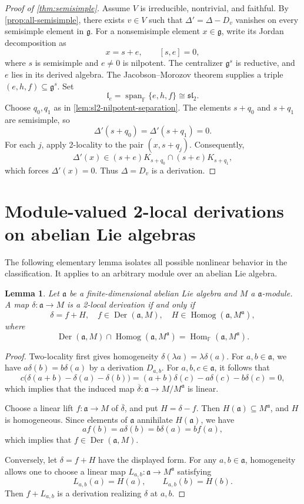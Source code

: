 \documentclass[12pt,reqno]{amsart}
\newtheorem{lemma}[theorem]{Lemma}
\theoremstyle{definition}
\theoremstyle{remark}
\numberwithin{equation}{section}
\newcommand{\F}{\mathbb{F}}
\newcommand{\g}{\mathfrak{g}}
\newcommand{\aLie}{\mathfrak{a}}
\newcommand{\Der}{\operatorname{Der}}
\newcommand{\Span}{\operatorname{span}}
\newcommand{\Homog}{\operatorname{Homog}}
\begin{document}
\begin{proof}[Proof of \cref{thm:semisimple}]
Assume \(V\) is irreducible, nontrivial, and faithful. By \cref{prop:all-semisimple}, there exists \(v\in V\) such that
\(\Delta'=\Delta-D_{v}\) vanishes on every semisimple element in \(\g\).
For a nonsemisimple element \(x\in\g\), write its Jordan
decomposition as
\[
  x=s+e,\qquad [s,e]=0,
\]
where \(s\) is semisimple and \(e\ne 0\) is nilpotent.
The centralizer \(\g^s\) is reductive, and \(e\) lies in its derived algebra.
The Jacobson--Morozov theorem supplies a triple \((e,h,f)\subseteq\g^s\).
Set
\[
  \mathfrak l_e= \Span_\F\{e,h,f\}\cong\mathfrak{sl}_2.
\]
Choose \(q_0,q_1\) as in \cref{lem:sl2-nilpotent-separation}.
The elements \(s+q_0\) and \(s+q_1\) are semisimple, so
\[
  \Delta'(s+q_0)= \Delta'(s+q_1)=0.
\]
For each \(j\), apply 2-locality to the pair \((x,s+q_j)\). Consequently,
\[
  \Delta'(x)\in(s+e)K_{s+q_0}\cap (s+e)K_{s+q_1},
\]
which forces \(\Delta'(x)=0\). Thus \(\Delta=D_v\) is a derivation.
\end{proof}

\section{Module-valued 2-local derivations on abelian Lie algebras}

The following elementary lemma isolates all possible nonlinear behavior in
the classification. It applies to an arbitrary module over an abelian Lie
algebra.

\begin{lemma}\label{lem:abelian-classification}
Let \(\aLie\) be a finite-dimensional abelian Lie algebra and \(M\) a \(\aLie\)-module. A map
\(\delta\colon\aLie\to M\) is a 2-local derivation if and only if
\[
 \delta=f+H,
 \quad
 f\in\Der(\aLie,M),\quad
 H\in\Homog(\aLie,M^\aLie),
\]
where
\[
\Der(\aLie,M)\cap \Homog(\aLie,M^\aLie)= \operatorname{Hom}_{\F}(\aLie,M^\aLie).
\]
\end{lemma}

\begin{proof}
Two-locality first gives homogeneity \(\delta(\lambda a)=\lambda\delta(a)\).
For \(a,b\in\aLie\), we have \(a\delta(b)=b\delta(a)\) by a derivation \(D_{a,b}\).
For \(a,b,c\in\aLie\), it follows that
\[
 c\bigl(\delta(a+b)-\delta(a)-\delta(b)\bigr)=(a+b)\delta(c)-a\delta(c)-b\delta(c)=0,
\]
which implies that the induced map \(\overline\delta\colon\aLie\longrightarrow M/M^\aLie\) is linear.

Choose a linear lift \(f\colon\aLie\to M\) of \(\overline\delta\), and put
\(H=\delta-f\).  Then \(H(\aLie)\subseteq M^\aLie\), and \(H\) is
homogeneous.  Since elements of \(\aLie\) annihilate \(H(\aLie)\), we have
\[
 af(b)=a\delta(b)=b\delta(a)=bf(a),
\]
which implies that \(f\in\Der(\aLie,M)\).

Conversely, let \(\delta=f+H\) have the displayed form.  For any \(a,b\in \aLie\),
homogeneity allows one to choose a linear map
\(L_{a,b}\colon\aLie\to M^\aLie\) satisfying
\[
 L_{a,b}(a)=H(a),\qquad L_{a,b}(b)=H(b).
\]
Then \(f+L_{a,b}\) is a derivation realizing \(\delta\) at \(a,b\).
\end{proof}
\end{document}
